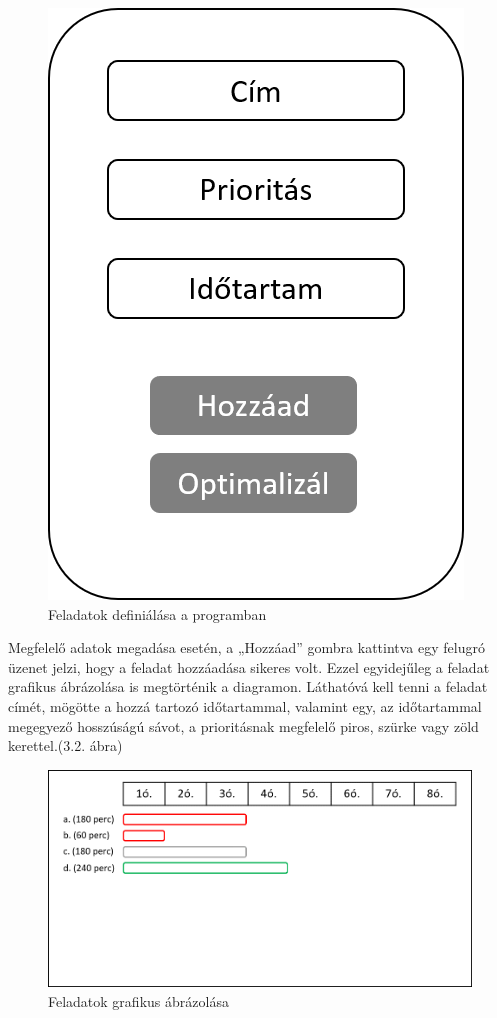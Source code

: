 \begin{figure}[h]
	\centering
	\includegraphics[scale=0.6]{images/addTasks.png}
	\caption{Feladatok definiálása a programban}
\end{figure}

Megfelelő adatok megadása esetén, a „Hozzáad” gombra kattintva egy felugró üzenet jelzi, hogy a feladat hozzáadása sikeres volt. Ezzel egyidejűleg a feladat grafikus ábrázolása is megtörténik a diagramon. Láthatóvá kell tenni a feladat címét, mögötte a hozzá tartozó időtartammal, valamint egy, az időtartammal megegyező hosszúságú sávot, a prioritásnak megfelelő piros, szürke vagy zöld kerettel.(3.2. ábra)

\begin{figure}[h]
	\centering
	\includegraphics[scale=0.8]{images/diagram.png}
	\caption{Feladatok grafikus ábrázolása}
\end{figure}

